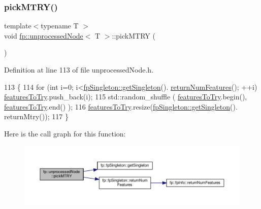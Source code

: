 \subsubsection{\texorpdfstring{pick\+M\+T\+R\+Y()}{pickMTRY()}\hspace{0.1cm}{\footnotesize\ttfamily [1/2]}}
{\footnotesize\ttfamily template$<$typename T $>$ \\
void \hyperlink{classfp_1_1unprocessedNode}{fp\+::unprocessed\+Node}$<$ T $>$\+::pick\+M\+T\+RY (\begin{DoxyParamCaption}{ }\end{DoxyParamCaption})\hspace{0.3cm}{\ttfamily [inline]}}



Definition at line 113 of file unprocessed\+Node.\+h.


\begin{DoxyCode}
113                                       \{
114                     \textcolor{keywordflow}{for} (\textcolor{keywordtype}{int} i=0; i<\hyperlink{classfp_1_1fpSingleton_a8bdae77b68521003e3fc630edec2e240}{fpSingleton::getSingleton}().
      \hyperlink{classfp_1_1fpSingleton_a97cbcad5ae9daa8c747fd4db84928c20}{returnNumFeatures}(); ++i) \hyperlink{classfp_1_1unprocessedNode_ab625569c5339dfbe93b487765f530313}{featuresToTry}.push\_back(i);
115                     std::random\_shuffle ( \hyperlink{classfp_1_1unprocessedNode_ab625569c5339dfbe93b487765f530313}{featuresToTry}.begin(), 
      \hyperlink{classfp_1_1unprocessedNode_ab625569c5339dfbe93b487765f530313}{featuresToTry}.end() );
116                     \hyperlink{classfp_1_1unprocessedNode_ab625569c5339dfbe93b487765f530313}{featuresToTry}.resize(\hyperlink{classfp_1_1fpSingleton_a8bdae77b68521003e3fc630edec2e240}{fpSingleton::getSingleton}().
      returnMtry());
117                 \}
\end{DoxyCode}
Here is the call graph for this function\+:
\nopagebreak
\begin{figure}[H]
\begin{center}
\leavevmode
\includegraphics[width=350pt]{classfp_1_1unprocessedNode_a5302bdd3ad2b0de3e2fcd8ed1bf58f61_cgraph}
\end{center}
\end{figure}
\mbox{\label{classfp_1_1unprocessedNode_a5302bdd3ad2b0de3e2fcd8ed1bf58f61}} 
